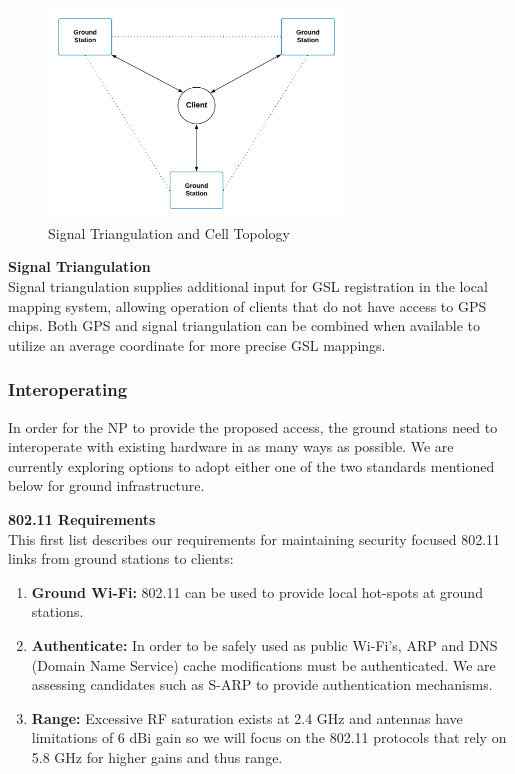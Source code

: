 \documentclass[11pt]{article}
\begin{document}
\begin{figure}[h]
    \centering
    \includegraphics[width=0.7\textwidth]{./images/rsz_triangulation.png}
    \caption{Signal Triangulation and Cell Topology}
\end{figure}

{\noindent\textbf{Signal Triangulation}} \\ 

\noindent Signal triangulation supplies additional input for GSL registration in the local mapping system, allowing operation of clients that do not have access to GPS chips.
Both GPS and signal triangulation can be combined when available to utilize an average coordinate for more precise GSL mappings.



\subsubsection{Interoperating}

In order for the NP to provide the proposed access, the ground stations need to interoperate with existing hardware in as many ways as possible.
We are currently exploring options to adopt either one of the two standards mentioned below for ground infrastructure.

\bigskip
{\noindent\textbf{802.11 Requirements}} \\

\noindent This first list describes our requirements for maintaining security focused 802.11 links from ground stations to clients:

\begin{enumerate}
    \item \textbf{Ground Wi-Fi:} 802.11 can be used to provide local hot-spots at ground stations.
    \item \textbf{Authenticate:} In order to be safely used as public Wi-Fi's, ARP and DNS (Domain Name Service) cache modifications must be authenticated. We are assessing candidates such as S-ARP \cite{S-ARP} to provide authentication mechanisms.
    \item \textbf{Range:} Excessive RF saturation exists at 2.4 GHz and antennas have limitations of 6 dBi gain so we will focus on the 802.11 protocols that rely on 5.8 GHz for higher gains and thus range.
\end{enumerate}
\end{document}
